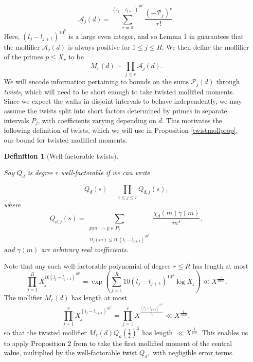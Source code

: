 \documentclass[12pt]{amsart}
\numberwithin{equation}{section}
\newtheorem{df}[thm]{Definition}
\numberwithin{thm}{section}
\newcommand{\1}{\mathbf 1}
\begin{document}
\begin{equation}\label{defaj}
	\mathscr{A}_j(d)=\sum^{(l_j-l_{j+1})^{10^5}}_{r=0} \frac{(-\mathscr{P}_j)^r}{r!}.
\end{equation}
Here, $(l_j-l_{j+1})^{10^5}$ is a large even integer, and so Lemma 1 in \cite{RS2} guarantees that the mollifier $\mathscr{A}_j(d)$ is always positive for $1\le j\le R.$ We then define the mollifier of the primes $p\le X_r$ to be  \begin{equation}\label{Mollchoice}
	M_r(d)=\prod_{j\le r}\mathscr{A}_j(d).
\end{equation}	We will encode information pertaining to bounds on the sums $\mathscr{P}_j(d)$ through \textit{twists}, which will need to be short enough to take twisted mollified moments. Since we expect the walks in disjoint intervals to behave independently, we may assume the twists  split into short factors determined by primes in separate intervals $P_j$,  with coefficients varying depending on $d$. This motivates the following definition of twists, which we will use in Proposition \ref{twistmollprop}, our bound for twisted mollified moments. \begin{df}[Well-factorable twists]\label{Qdef}

Say $Q_d$ is degree $r$ well-factorable if we can write

\begin{equation}\label{Qsplit}
	Q_d(s)=\prod_{1\le j \le r} Q_{d,j}(s),\end{equation}  where \begin{equation}
	Q_{d,j}(s)=\sum_{\substack{p|m \implies p\in P_{j}\\ \Omega_j(m)\le 10(l_j-l_{j+1})^{10^4}}}\frac{\chi_d(m)\gamma(m)}{m^s},
\end{equation}
and $\gamma(m)$ are arbitrary real coefficients.\end{df} Note that any such  well-factorable polynomial of degree $r\le R$ has length at most
\begin{equation}\label{Tbound}
	\prod^{R}_{j=1} X_j^{10(l_j-l_{j+1})^{10^4}}=\exp\left(\sum^{R}_{j=1} 10(l_j-l_{j+1})^{10^4}\log X_{j}\right)\ll X^{\frac{1}{1000}}.
\end{equation}
The mollifier $M_r(d)$  has length at most \begin{equation}
	\prod^r_{j=1} X_j^{(l_j-l_{j+1})^{10^5}}=\prod^r_{j=1}X^{\frac{(l_j-l_{j+1})^{10^5}}{l_j}} \ll X^{\frac{1}{1000}},
\end{equation} so that the twisted mollifier $M_r(d)Q_d\left(\frac{1}{2}\right)^2$ has length $\ll X^{\frac{1}{100}}.$
This enables us to apply Proposition 2 from \cite{RS2} to take the first mollified moment of the central value, multiplied by the well-factorable twist $Q_d,$ with negligible error terms.
\end{document}
